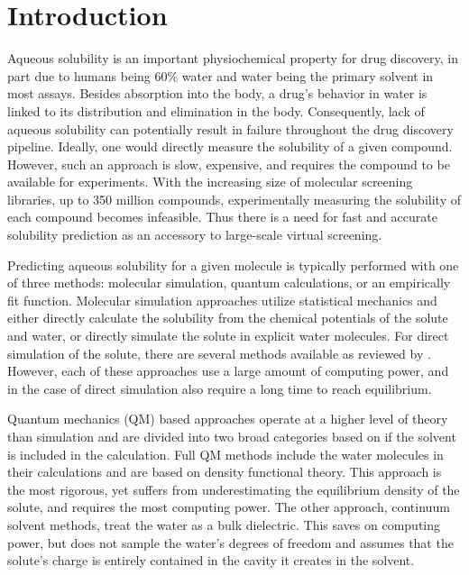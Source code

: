 \documentclass[journal=jmcmar,manuscript=article]{achemso}
\begin{document}

\section{Introduction}
Aqueous solubility is an important physiochemical property for drug discovery, in part due to humans being 60\% water\cite{HumanWater} and water being the primary solvent in most assays. 
Besides absorption into the body, a drug's behavior in water is linked to its distribution and elimination in the body.
Consequently, lack of aqueous solubility can potentially result in failure throughout the drug discovery pipeline.\cite{LIPINSKI1997,DI2006446,EKINS2002305}
Ideally, one would directly measure the solubility of a given compound.
However, such an approach is slow, expensive, and requires the compound to be available for experiments.
With the increasing size of molecular screening libraries, up to 350 million compounds,\cite{NatureVS} experimentally measuring the solubility of each compound becomes infeasible.
Thus there is a need for fast and accurate solubility prediction as an accessory to large-scale virtual screening.

Predicting aqueous solubility for a given molecule is typically performed with one of three methods: molecular simulation, quantum calculations, or an empirically fit function.
Molecular simulation approaches utilize statistical mechanics and either directly calculate the solubility from the chemical potentials of the solute and water\cite{denseStates}, or directly simulate the solute in explicit water molecules.
For direct simulation of the solute, there are several methods available as reviewed by \citet{solrev1}.
However, each of these approaches use a large amount of computing power, and in the case of direct simulation also require a long time to reach equilibrium.

Quantum mechanics (QM) based approaches operate at a higher level of theory than simulation and are divided into two broad categories based on if the solvent is included in the calculation. 
Full QM methods include the water molecules in their calculations and are based on density functional theory\cite{solrev1}.
This approach is the most rigorous, yet suffers from underestimating the equilibrium density of the solute\cite{solrev1}, and requires the most computing power.
The other approach, continuum solvent methods, treat the water as a bulk dielectric.
This saves on computing power, but does not sample the water's degrees of freedom and assumes that the solute's charge is entirely contained in the cavity it creates in the solvent.
\end{document}
